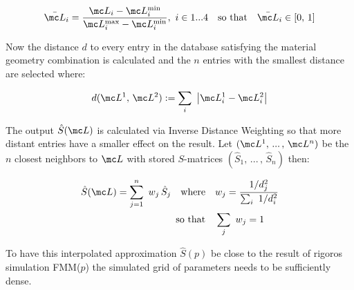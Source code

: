 \begin{equation}
    \bar{\mc L}_i = \frac{\mc L_i - \mc L_i^\s{min}}{\mc L_i^\s{max} - \mc L_i^\s{min}}
    , \  i \in 1 ... 4
    \qq{so that} \bar{\mc L}_i \in [0, \, 1]
\end{equation}

\noindent
Now the distance $d$ to every entry in the database satisfying the material geometry combination is calculated and the $n$ entries with the smallest distance are selected where:

\begin{equation}
    d(\mc L^1, \, \mc L^2) := \sum_i \ \qty|\mc L^1_i - \mc L^2_i|
\end{equation}

\noindent
The output $\hat{S}(\mc L)$ is calculated via Inverse Distance Weighting \cite{Shepard1968} so that more distant entries have a smaller effect on the result. Let
$(\mc L^1, \, ... \, , \, \mc L^n)$ be the $n$ closest neighbors to $\mc L$ with stored $S$-matrices
$(\hat{S}_1, \, ... \, , \, \hat{S}_n)$
then:

\begin{equation}
\begin{aligned}
    \hat{S}(\mc L) = \sum_{j=1}^n \ w_j \, \hat{S}_j
    \qq{where}& w_j = \frac{1 / d_j^2}{\sum_i \ 1 / d^2_i} \\
    \qq*{so that} &\sum_j \ w_j = 1
\end{aligned}
\end{equation}

\noindent
To have this interpolated approximation $\hat{S}(p)$ be close to the result of rigoros simulation FMM($p$) the simulated grid of parameters needs to be sufficiently dense. 
